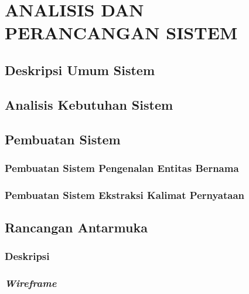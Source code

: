 \documentclass[ugmskripsi]{ugmskripsi}
\begin{document}
\chapter{ANALISIS DAN PERANCANGAN SISTEM}
\label{ANALISIS DAN PERANCANGAN SISTEM}

	\section{Deskripsi Umum Sistem}
	\label{rancangan deskripsi umum sistem}
	

	\section{Analisis Kebutuhan Sistem}
	\label{rancangan analisis kebutuhan sistem}
	

	\section{Pembuatan Sistem}
	\label{rancangan pembuatan sistem}

		\subsection{Pembuatan Sistem Pengenalan Entitas Bernama}
		\label{rancangan pembuatan sistem pengenalan entitas bernama}
		

		\subsection{Pembuatan Sistem Ekstraksi Kalimat Pernyataan}
		\label{rancangan sistem ekstraksi kalimat pernyataan}
		

	\section{Rancangan Antarmuka}
	\label{rancangan antarmuka}

		\subsection{Deskripsi}
		\label{rancangan deskripsi antarmuka}
		

		\subsection{\textit{Wireframe}}
	    \label{rancangan wireframe antarmuka}
	    
\end{document}
